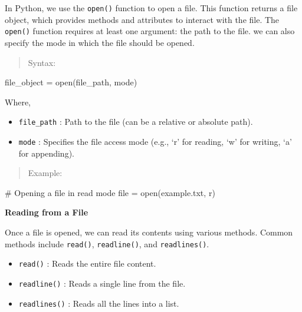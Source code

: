 \documentclass[
  letterpaper,
  DIV=11,
  numbers=noendperiod]{scrreprt}
\newenvironment{Shaded}{\begin{snugshade}}{\end{snugshade}}
\newcommand{\BuiltInTok}[1]{\textcolor[rgb]{0.00,0.23,0.31}{#1}}
\newcommand{\CommentTok}[1]{\textcolor[rgb]{0.37,0.37,0.37}{#1}}
\newcommand{\NormalTok}[1]{\textcolor[rgb]{0.00,0.23,0.31}{#1}}
\newcommand{\OperatorTok}[1]{\textcolor[rgb]{0.37,0.37,0.37}{#1}}
\newcommand{\StringTok}[1]{\textcolor[rgb]{0.13,0.47,0.30}{#1}}
\providecommand{\tightlist}{%
  \setlength{\itemsep}{0pt}\setlength{\parskip}{0pt}}\usepackage{longtable,booktabs,array}
\theoremstyle{plain}
\theoremstyle{definition}
\theoremstyle{remark}
\begin{document}
In Python, we use the \texttt{open()} function to open a file. This
function returns a file object, which provides methods and attributes to
interact with the file. The \texttt{open()} function requires at least
one argument: the path to the file. we can also specify the mode in
which the file should be opened.

\begin{quote}
Syntax:
\end{quote}

\begin{Shaded}
\begin{Highlighting}[]
\NormalTok{file\_object }\OperatorTok{=} \BuiltInTok{open}\NormalTok{(file\_path, mode)}
\end{Highlighting}
\end{Shaded}

Where,

\begin{itemize}
\tightlist
\item
  \texttt{file\_path} : Path to the file (can be a relative or absolute
  path).
\item
  \texttt{mode} : Specifies the file access mode (e.g., `r' for reading,
  `w' for writing, `a' for appending).
\end{itemize}

\begin{quote}
Example:
\end{quote}

\begin{Shaded}
\begin{Highlighting}[]
\CommentTok{\# Opening a file in read mode}
\BuiltInTok{file} \OperatorTok{=} \BuiltInTok{open}\NormalTok{(}\StringTok{\textquotesingle{}example.txt\textquotesingle{}}\NormalTok{, }\StringTok{\textquotesingle{}r\textquotesingle{}}\NormalTok{)}
\end{Highlighting}
\end{Shaded}

\textbf{Reading from a File}

Once a file is opened, we can read its contents using various methods.
Common methods include \texttt{read()}, \texttt{readline()}, and
\texttt{readlines()}.

\begin{itemize}
\tightlist
\item
  \texttt{read()} : Reads the entire file content.
\item
  \texttt{readline()} : Reads a single line from the file.
\item
  \texttt{readlines()} : Reads all the lines into a list.
\end{itemize}
\end{document}
